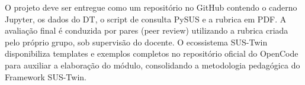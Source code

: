 O projeto deve ser entregue como um repositório no GitHub contendo o caderno
Jupyter, os dados do DT, o script de consulta PySUS e a rubrica em PDF. A
avaliação final é conduzida por pares (peer review) utilizando a rubrica
criada pelo próprio grupo, sob supervisão do docente. O ecossistema SUS-Twin
disponibiliza templates e exemplos completos no repositório oficial do
OpenCode para auxiliar a elaboração do módulo, consolidando a metodologia
pedagógica do Framework SUS-Twin.
